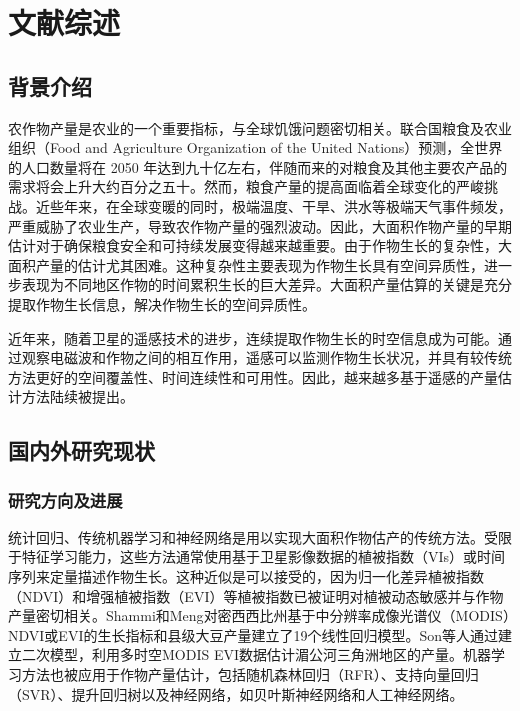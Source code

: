 \cleardoublepage
\newrefsection
\chapter{文献综述}

\section{背景介绍}

\par 农作物产量是农业的一个重要指标，与全球饥饿问题密切相关。联合国粮食及农业组织（Food and Agriculture Organization of the United Nations）预测，全世界的人口数量将在 2050 年达到九十亿左右，伴随而来的对粮食及其他主要农产品的需求将会上升大约百分之五十。然而，粮食产量的提高面临着全球变化的严峻挑战。近些年来，在全球变暖的同时，极端温度、干旱、洪水等极端天气事件频发，严重威胁了农业生产，导致农作物产量的强烈波动。因此，大面积作物产量的早期估计对于确保粮食安全和可持续发展变得越来越重要。由于作物生长的复杂性，大面积产量的估计尤其困难。这种复杂性主要表现为作物生长具有空间异质性，进一步表现为不同地区作物的时间累积生长的巨大差异\cite{kuwata2015estimating}。大面积产量估算的关键是充分提取作物生长信息，解决作物生长的空间异质性。

\par 近年来，随着卫星的遥感技术的进步，连续提取作物生长的时空信息成为可能。通过观察电磁波和作物之间的相互作用\cite{guan2017shared, zhang2003monitoring}，遥感可以监测作物生长状况，并具有较传统方法更好的空间覆盖性、时间连续性和可用性\cite{claverie2013validation}。因此，越来越多基于遥感的产量估计方法陆续被提出。

\section{国内外研究现状}

\subsection{研究方向及进展}

\par 统计回归、传统机器学习和神经网络是用以实现大面积作物估产的传统方法。受限于特征学习能力，这些方法通常使用基于卫星影像数据的植被指数（VIs）\cite{shammi2021use, stas2016comparison}或时间序列\cite{Aghighi2018Machine, nagy2018wheat}来定量描述作物生长。这种近似是可以接受的，因为归一化差异植被指数（NDVI）和增强植被指数（EVI）等植被指数已被证明对植被动态敏感\cite{sellers1987canopy, tucker1979red}并与作物产量密切相关\cite{shanahan2001use}。Shammi和Meng\cite{shammi2021use}对密西西比州基于中分辨率成像光谱仪（MODIS）NDVI或EVI的生长指标和县级大豆产量建立了19个线性回归模型。Son等人\cite{son2014comparative}通过建立二次模型，利用多时空MODIS EVI数据估计湄公河三角洲地区的产量。机器学习方法也被应用于作物产量估计，包括随机森林回归（RFR）、支持向量回归（SVR）、提升回归树\cite{abebe2022combined, aghighi2018machine}以及神经网络，如贝叶斯神经网络和人工神经网络\cite{fernandes2017sugarcane,johnson2016crop}。

